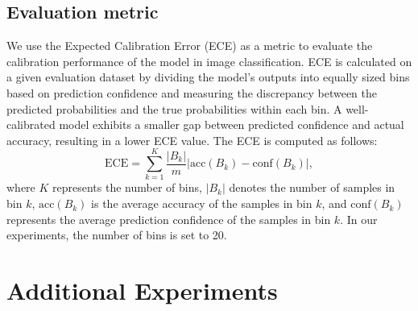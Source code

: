 \subsection{Evaluation metric}
We use the Expected Calibration Error (ECE) \citep{naeini2015obtaining, yoon2024c} as a metric to evaluate the calibration performance of the model in image classification. 
ECE is calculated on a given evaluation dataset by dividing the model's outputs into equally sized bins based on prediction confidence and measuring the discrepancy between the predicted probabilities and the true probabilities within each bin.
A well-calibrated model exhibits a smaller gap between predicted confidence and actual accuracy, resulting in a lower ECE value.
The ECE is computed as follows:
\begin{equation}
\mathrm{ECE} = \sum_{k=1}^{K} \frac{|B_k|}{m} \left| \mathrm{acc}(B_k) - \mathrm{conf}(B_k) \right|,
\end{equation}
where \(K\) represents the number of bins, \(|B_k|\) denotes the number of samples in bin \(k\), \(\mathrm{acc}(B_k)\) is the average accuracy of the samples in bin \(k\), and \(\mathrm{conf}(B_k)\) represents the average prediction confidence of the samples in bin \(k\).
In our experiments, the number of bins is set to 20.

\section{Additional Experiments}

